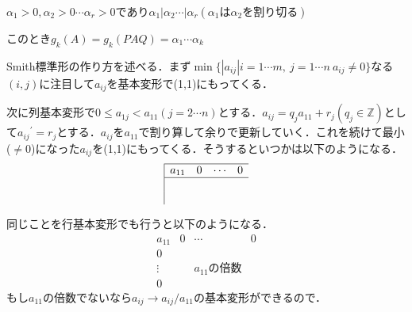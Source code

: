 ${\alpha}_1 >0,{\alpha}_2 >0\cdots {\alpha}_r >0$であり${\alpha}_1 |{\alpha}_2 \cdots |{\alpha}_r ({\alpha}_1 は{\alpha}_2 を割り切る)$

このとき$g_k (A)=g_k (PAQ)={\alpha}_1 \cdots{\alpha}_k$

Smith標準形の作り方を述べる．まず$\min\{ |a_{ij}|i=1\cdots m,\ j=1\cdots n\ a_{ij}\neq 0\}$なる$(i,j)$に注目して$a_{ij}$を基本変形で(1,1)にもってくる．

次に列基本変形で$0\leq a_{1j}<a_{11} (j=2\cdots n)$とする．$a_{ij}=q_j a_{11}+r_j (q_j \in\mathbb{Z})$として${a_{ij}}^{'}=r_j$とする．$a_{ij}$を$a_{11}$で割り算して余りで更新していく．これを続けて最小($\neq 0$)になった$a_{ij}$を(1,1)にもってくる．そうするといつかは以下のようになる．
\begin{equation}
  \begin{array}{|cccc}
    \hline
    a_{11}&0&\cdots&0\\\hline
    &&&\\
    &&&
  \end{array}
\end{equation}

同じことを行基本変形でも行うと以下のようになる．
\begin{equation}
  \begin{array}{c|ccc}
    a_{11}&0&\cdots&0\\\hline
    0&&&\\
    \vdots&&a_{11}の倍数&\\
    0&&&
  \end{array}
\end{equation}
もし$a_{11}$の倍数でないなら$a_{ij}\to a_{ij}/a_{11}$の基本変形ができるので．
